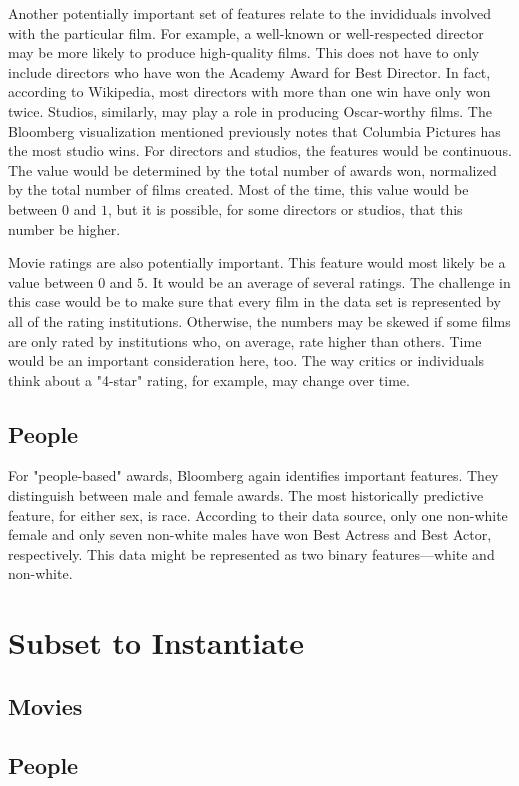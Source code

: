 \documentclass[11pt]{article}
\begin{document}
Another potentially important set of features relate to the invididuals
involved with the particular film. For example, a well-known or well-respected
director may be more likely to produce high-quality films. This does not have
to only include directors who have won the Academy Award for Best Director. In
fact, according to Wikipedia\cite{wikibestdirector}, most directors with more
than one win have only won twice. Studios, similarly, may play a role in
producing Oscar-worthy films. The Bloomberg visualization mentioned previously
notes that Columbia Pictures has the most studio wins. For directors and
studios, the features would be continuous. The value would be determined by the 
total number of awards won, normalized by the total number of films created.
Most of the time, this value would be between $0$ and $1$, but it is possible,
for some directors or studios, that this number be higher.

Movie ratings are also potentially important. This feature would most likely be
a value between $0$ and $5$. It would be an average of several ratings. The
challenge in this case would be to make sure that every film in the data set
is represented by all of the rating institutions. Otherwise, the numbers may be
skewed if some films are only rated by institutions who, on average, rate
higher than others. Time would be an important consideration here, too. The way
critics or individuals think about a "4-star" rating, for example, may change
over time.

\subsection{People}

For "people-based" awards, Bloomberg again identifies important features. They
distinguish between male and female awards. The most historically predictive
feature, for either sex, is race. According to their data source, only one
non-white female and only seven non-white males have won Best Actress and Best
Actor, respectively. This data might be represented as two binary
features---white and non-white.

\section{Subset to Instantiate}

\subsection{Movies}

\subsection{People}

 
\end{document}
